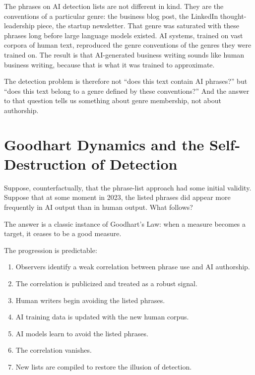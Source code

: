 \documentclass[12pt]{article}
\begin{document}
The phrases on AI detection lists are not different in kind. They are the conventions of a particular genre: the business blog post, the LinkedIn thought-leadership piece, the startup newsletter. That genre was saturated with these phrases long before large language models existed. AI systems, trained on vast corpora of human text, reproduced the genre conventions of the genres they were trained on. The result is that AI-generated business writing sounds like human business writing, because that is what it was trained to approximate.

The detection problem is therefore not ``does this text contain AI phrases?'' but ``does this text belong to a genre defined by these conventions?'' And the answer to that question tells us something about genre membership, not about authorship.

\section{Goodhart Dynamics and the Self-Destruction of Detection}

Suppose, counterfactually, that the phrase-list approach had some initial validity. Suppose that at some moment in 2023, the listed phrases did appear more frequently in AI output than in human output. What follows?

The answer is a classic instance of Goodhart's Law: when a measure becomes a target, it ceases to be a good measure.

The progression is predictable:

\begin{enumerate}[noitemsep]
  \item Observers identify a weak correlation between phrase use and AI authorship.
  \item The correlation is publicized and treated as a robust signal.
  \item Human writers begin avoiding the listed phrases.
  \item AI training data is updated with the new human corpus.
  \item AI models learn to avoid the listed phrases.
  \item The correlation vanishes.
  \item New lists are compiled to restore the illusion of detection.
\end{enumerate}
\end{document}
